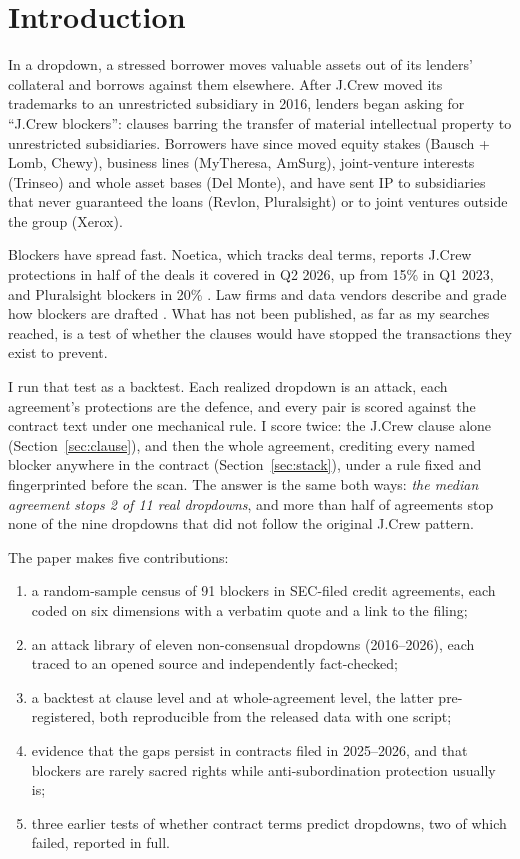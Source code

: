 \documentclass[12pt]{article}
\begin{document}
\section{Introduction}
In a dropdown, a stressed borrower moves valuable assets out of its lenders' collateral and borrows against them elsewhere. After J.Crew moved its trademarks to an unrestricted subsidiary in 2016, lenders began asking for ``J.Crew blockers'': clauses barring the transfer of material intellectual property to unrestricted subsidiaries. Borrowers have since moved equity stakes (Bausch + Lomb, Chewy), business lines (MyTheresa, AmSurg), joint-venture interests (Trinseo) and whole asset bases (Del Monte), and have sent IP to subsidiaries that never guaranteed the loans (Revlon, Pluralsight) or to joint ventures outside the group (Xerox).

Blockers have spread fast. Noetica, which tracks deal terms, reports J.Crew protections in half of the deals it covered in Q2 2026, up from 15\% in Q1 2023, and Pluralsight blockers in 20\% \citep{Noetica2026}. Law firms and data vendors describe and grade how blockers are drafted \citep{Cleary2025,Octus2025}. What has not been published, as far as my searches reached, is a test of whether the clauses would have stopped the transactions they exist to prevent.

I run that test as a backtest. Each realized dropdown is an attack, each agreement's protections are the defence, and every pair is scored against the contract text under one mechanical rule. I score twice: the J.Crew clause alone (Section~\ref{sec:clause}), and then the whole agreement, crediting every named blocker anywhere in the contract (Section~\ref{sec:stack}), under a rule fixed and fingerprinted before the scan. The answer is the same both ways: \emph{the median agreement stops 2 of 11 real dropdowns}, and more than half of agreements stop none of the nine dropdowns that did not follow the original J.Crew pattern.

The paper makes five contributions:
\begin{enumerate}
\item a random-sample census of 91 blockers in SEC-filed credit agreements, each coded on six dimensions with a verbatim quote and a link to the filing;
\item an attack library of eleven non-consensual dropdowns (2016--2026), each traced to an opened source and independently fact-checked;
\item a backtest at clause level and at whole-agreement level, the latter pre-registered, both reproducible from the released data with one script;
\item evidence that the gaps persist in contracts filed in 2025--2026, and that blockers are rarely sacred rights while anti-subordination protection usually is;
\item three earlier tests of whether contract terms predict dropdowns, two of which failed, reported in full.
\end{enumerate}
\end{document}
